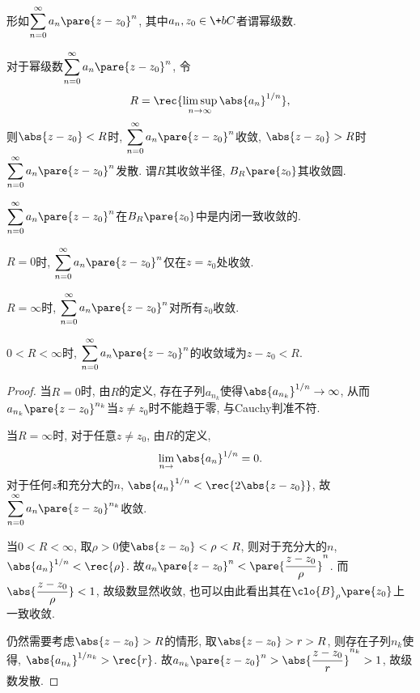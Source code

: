 \documentclass[../ComplexVariable.tex]{subfiles}
\begin{document}
\begin{definition}[幂级数]
    形如$\displaystyle \sum_{n=0}^\infty a_n\pare{z-z_0}^n$, 其中$a_n,z_0\in \+bC$者谓幂级数.
\end{definition}
\begin{theorem}[Abel判准]
    对于幂级数$\displaystyle \sum_{n=0}^\infty a_n\pare{z-z_0}^n$, 令
    \[ R = \rec{\limsup \limits_{n\rightarrow \infty} \abs{a_n}^{1/n}}, \]
    则$\abs{z-z_0}<R$时, $\displaystyle \sum_{n=0}^\infty a_n\pare{z-z_0}^n$收敛, $\abs{z-z_0}>R$时$\displaystyle \sum_{n=0}^\infty a_n\pare{z-z_0}^n$发散. 谓$R$其收敛半径, $B_R\pare{z_0}$其收敛圆.
\end{theorem}
\begin{remark}
    $\displaystyle \sum_{n=0}^\infty a_n\pare{z-z_0}^n$在$B_R\pare{z_0}$中是内闭一致收敛的.
\end{remark}
\begin{remark}
    $R=0$时, $\displaystyle \sum_{n=0}^\infty a_n\pare{z-z_0}^n$仅在$z=z_0$处收敛.
\end{remark}
\begin{remark}
    $R=\infty$时, $\displaystyle \sum_{n=0}^\infty a_n\pare{z-z_0}^n$对所有$z_0$收敛.
\end{remark}
\begin{remark}
    $0<R<\infty$时, $\displaystyle \sum_{n=0}^\infty a_n\pare{z-z_0}^n$的收敛域为${z-z_0}<R$.
\end{remark}
\begin{proof}
    当$R=0$时, 由$R$的定义, 存在子列$a_{n_k}$使得$\abs{a_{n_k}}^{1/n}\rightarrow\infty$, 从而$a_{n_k}\pare{z-z_0}^{n_k}$当$z\neq z_0$时不能趋于零, 与Cauchy判准不符.
    \par
    当$R=\infty$时, 对于任意$z\neq z_0$, 由$R$的定义,
    \[ \lim_{n\rightarrow} \abs{a_n}^{1/n} = 0. \]
    对于任何$z$和充分大的$n$, $\displaystyle\abs{a_n}^{1/n} < \rec{{2\abs{z-z_0}}}$, 故$\displaystyle \sum_{n=0}^\infty a_n\pare{z-z_0}^{n_k}$收敛.
    \par
    当$0<R<\infty$, 取$\rho>0$使$\abs{z-z_0}<\rho<R$, 则对于充分大的$n$, $\abs{a_n}^{1/n} < \displaystyle \rec{\rho}$. 故$a_n\pare{z-z_0}^n < \displaystyle \pare{\frac{z-z_0}{\rho}}^n$. 而$\displaystyle \abs{\frac{z-z_0}{\rho}}<1$, 故级数显然收敛, 也可以由此看出其在$\clo{B}_\rho\pare{z_0}$上一致收敛.
    \par
    仍然需要考虑$\abs{z-z_0}>R$的情形, 取$\abs{z-z_0}>r>R$, 则存在子列$n_k$使得, $\abs{a_{n_k}}^{1/n_k}>\displaystyle \rec{r}$. 故$a_{n_k}\pare{z-z_0}^n > \displaystyle\abs{\frac{z-z_0}{r}}^{n_k}>1$, 故级数发散.
\end{proof}
\end{document}
